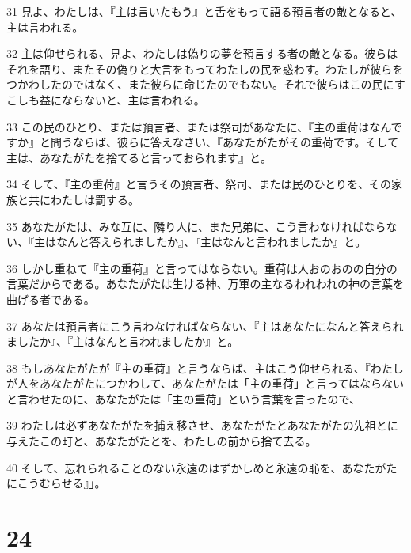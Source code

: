 \par 31 見よ、わたしは、『主は言いたもう』と舌をもって語る預言者の敵となると、主は言われる。
\par 32 主は仰せられる、見よ、わたしは偽りの夢を預言する者の敵となる。彼らはそれを語り、またその偽りと大言をもってわたしの民を惑わす。わたしが彼らをつかわしたのではなく、また彼らに命じたのでもない。それで彼らはこの民にすこしも益にならないと、主は言われる。
\par 33 この民のひとり、または預言者、または祭司があなたに、『主の重荷はなんですか』と問うならば、彼らに答えなさい、『あなたがたがその重荷です。そして主は、あなたがたを捨てると言っておられます』と。
\par 34 そして、『主の重荷』と言うその預言者、祭司、または民のひとりを、その家族と共にわたしは罰する。
\par 35 あなたがたは、みな互に、隣り人に、また兄弟に、こう言わなければならない、『主はなんと答えられましたか』、『主はなんと言われましたか』と。
\par 36 しかし重ねて『主の重荷』と言ってはならない。重荷は人おのおのの自分の言葉だからである。あなたがたは生ける神、万軍の主なるわれわれの神の言葉を曲げる者である。
\par 37 あなたは預言者にこう言わなければならない、『主はあなたになんと答えられましたか』、『主はなんと言われましたか』と。
\par 38 もしあなたがたが『主の重荷』と言うならば、主はこう仰せられる、『わたしが人をあなたがたにつかわして、あなたがたは「主の重荷」と言ってはならないと言わせたのに、あなたがたは「主の重荷」という言葉を言ったので、
\par 39 わたしは必ずあなたがたを捕え移させ、あなたがたとあなたがたの先祖とに与えたこの町と、あなたがたとを、わたしの前から捨て去る。
\par 40 そして、忘れられることのない永遠のはずかしめと永遠の恥を、あなたがたにこうむらせる』」。

\chapter{24}

